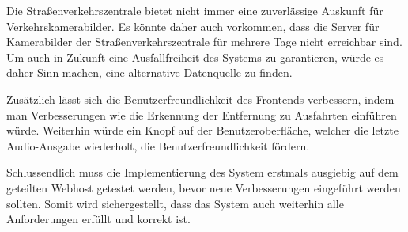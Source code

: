 Die Straßenverkehrszentrale bietet nicht immer eine zuverlässige Auskunft für Verkehrskamerabilder.
Es könnte daher auch vorkommen, dass die Server für Kamerabilder der Straßenverkehrszentrale für mehrere Tage nicht erreichbar sind.
Um auch in Zukunft eine Ausfallfreiheit des Systems zu garantieren, würde es daher Sinn machen, eine alternative Datenquelle zu finden.

Zusätzlich lässt sich die Benutzerfreundlichkeit des Frontends verbessern, indem man Verbesserungen wie die Erkennung der Entfernung zu Ausfahrten einführen würde.
Weiterhin würde ein Knopf auf der Benutzeroberfläche, welcher die letzte Audio-Ausgabe wiederholt, die Benutzerfreundlichkeit fördern.

Schlussendlich muss die Implementierung des System erstmals ausgiebig auf dem geteilten Webhost getestet werden, bevor neue Verbesserungen eingeführt werden sollten.
Somit wird sichergestellt, dass das System auch weiterhin alle Anforderungen erfüllt und korrekt ist.
